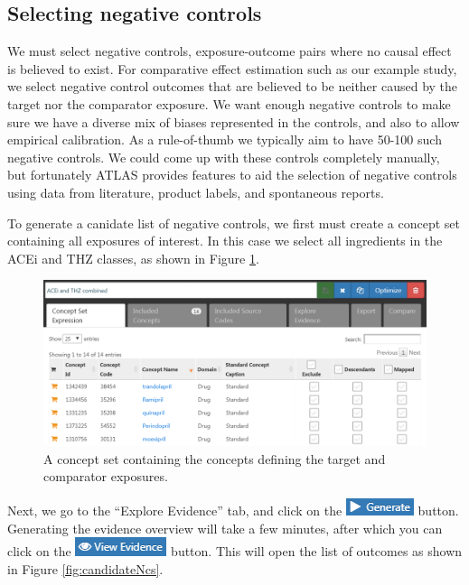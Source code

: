\documentclass[11pt]{book}
\begin{document}
\subsection{Selecting negative
controls}\label{selecting-negative-controls}

We must select negative controls, exposure-outcome pairs where no causal
effect is believed to exist. For comparative effect estimation such as
our example study, we select negative control outcomes that are believed
to be neither caused by the target nor the comparator exposure. We want
enough negative controls to make sure we have a diverse mix of biases
represented in the controls, and also to allow empirical calibration. As
a rule-of-thumb we typically aim to have 50-100 such negative controls.
We could come up with these controls completely manually, but
fortunately ATLAS provides features to aid the selection of negative
controls using data from literature, product labels, and spontaneous
reports.

To generate a canidate list of negative controls, we first must create a
concept set containing all exposures of interest. In this case we select
all ingredients in the ACEi and THZ classes, as shown in Figure
\ref{fig:exposuresConceptSet}.

\begin{figure}

{\centering \includegraphics[width=1\linewidth]{images/MethodValidity/exposuresConceptSet} 

}

\caption{A concept set containing the concepts defining the target and comparator exposures.}\label{fig:exposuresConceptSet}
\end{figure}

Next, we go to the ``Explore Evidence'' tab, and click on the
\includegraphics{images/MethodValidity/generate.png} button. Generating
the evidence overview will take a few minutes, after which you can click
on the \includegraphics{images/MethodValidity/viewEvidence.png} button.
This will open the list of outcomes as shown in Figure
\ref{fig:candidateNcs}.
\end{document}
